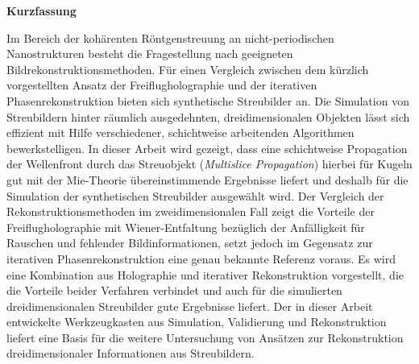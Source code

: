 	\begin{Huge}
		\textbf{Kurzfassung}\vspace{12mm}
	\end{Huge}
	
	Im Bereich der kohärenten Röntgenstreuung an nicht-periodischen Nanostrukturen besteht die Fragestellung nach geeigneten Bildrekonstruktionsmethoden. Für einen Vergleich zwischen dem kürzlich vorgestellten Ansatz der Freiflugholographie und der iterativen Phasenrekonstruktion bieten sich synthetische Streubilder an. Die Simulation von Streubildern hinter räumlich ausgedehnten, dreidimensionalen Objekten lässt sich effizient mit Hilfe verschiedener, schichtweise arbeitenden Algorithmen bewerkstelligen. In dieser Arbeit wird gezeigt, dass eine schichtweise Propagation der Wellenfront durch das Streuobjekt (\textit{Multislice Propagation}) hierbei für Kugeln gut mit der Mie-Theorie übereinstimmende Ergebnisse liefert und deshalb für die Simulation der synthetischen Streubilder ausgewählt wird. Der Vergleich der Rekonstruktionsmethoden im zweidimensionalen Fall zeigt die Vorteile der Freiflugholographie mit Wiener-Entfaltung bezüglich der Anfälligkeit für Rauschen und fehlender Bildinformationen, setzt jedoch im Gegensatz zur iterativen Phasenrekonstruktion eine genau bekannte Referenz voraus. Es wird eine Kombination aus Holographie und iterativer Rekonstruktion vorgestellt, die die Vorteile beider Verfahren verbindet und auch für die simulierten dreidimensionalen Streubilder gute Ergebnisse liefert. Der in dieser Arbeit entwickelte Werkzeugkasten aus Simulation, Validierung und Rekonstruktion liefert eine Basis für die weitere Untersuchung von Ansätzen zur Rekonstruktion dreidimensionaler Informationen aus Streubildern.
